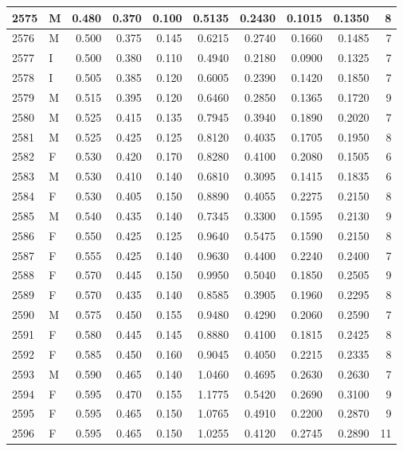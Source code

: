 \documentclass[9pt,twocolumn,twoside,]{pnas-new}
\begin{document}
\begin{tabular}{l|l|r|r|r|r|r|r|r|r}
\hline
2575 & M & 0.480 & 0.370 & 0.100 & 0.5135 & 0.2430 & 0.1015 & 0.1350 & 8\\
\hline
2576 & M & 0.500 & 0.375 & 0.145 & 0.6215 & 0.2740 & 0.1660 & 0.1485 & 7\\
\hline
2577 & I & 0.500 & 0.380 & 0.110 & 0.4940 & 0.2180 & 0.0900 & 0.1325 & 7\\
\hline
2578 & I & 0.505 & 0.385 & 0.120 & 0.6005 & 0.2390 & 0.1420 & 0.1850 & 7\\
\hline
2579 & M & 0.515 & 0.395 & 0.120 & 0.6460 & 0.2850 & 0.1365 & 0.1720 & 9\\
\hline
2580 & M & 0.525 & 0.415 & 0.135 & 0.7945 & 0.3940 & 0.1890 & 0.2020 & 7\\
\hline
2581 & M & 0.525 & 0.425 & 0.125 & 0.8120 & 0.4035 & 0.1705 & 0.1950 & 8\\
\hline
2582 & F & 0.530 & 0.420 & 0.170 & 0.8280 & 0.4100 & 0.2080 & 0.1505 & 6\\
\hline
2583 & M & 0.530 & 0.410 & 0.140 & 0.6810 & 0.3095 & 0.1415 & 0.1835 & 6\\
\hline
2584 & F & 0.530 & 0.405 & 0.150 & 0.8890 & 0.4055 & 0.2275 & 0.2150 & 8\\
\hline
2585 & M & 0.540 & 0.435 & 0.140 & 0.7345 & 0.3300 & 0.1595 & 0.2130 & 9\\
\hline
2586 & F & 0.550 & 0.425 & 0.125 & 0.9640 & 0.5475 & 0.1590 & 0.2150 & 8\\
\hline
2587 & F & 0.555 & 0.425 & 0.140 & 0.9630 & 0.4400 & 0.2240 & 0.2400 & 7\\
\hline
2588 & F & 0.570 & 0.445 & 0.150 & 0.9950 & 0.5040 & 0.1850 & 0.2505 & 9\\
\hline
2589 & F & 0.570 & 0.435 & 0.140 & 0.8585 & 0.3905 & 0.1960 & 0.2295 & 8\\
\hline
2590 & M & 0.575 & 0.450 & 0.155 & 0.9480 & 0.4290 & 0.2060 & 0.2590 & 7\\
\hline
2591 & F & 0.580 & 0.445 & 0.145 & 0.8880 & 0.4100 & 0.1815 & 0.2425 & 8\\
\hline
2592 & F & 0.585 & 0.450 & 0.160 & 0.9045 & 0.4050 & 0.2215 & 0.2335 & 8\\
\hline
2593 & M & 0.590 & 0.465 & 0.140 & 1.0460 & 0.4695 & 0.2630 & 0.2630 & 7\\
\hline
2594 & F & 0.595 & 0.470 & 0.155 & 1.1775 & 0.5420 & 0.2690 & 0.3100 & 9\\
\hline
2595 & F & 0.595 & 0.465 & 0.150 & 1.0765 & 0.4910 & 0.2200 & 0.2870 & 9\\
\hline
2596 & F & 0.595 & 0.465 & 0.150 & 1.0255 & 0.4120 & 0.2745 & 0.2890 & 11\\

\end{tabular}
\end{document}
